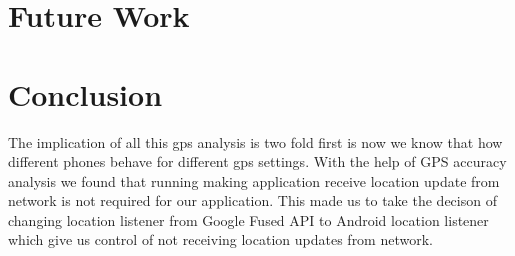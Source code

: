 \documentclass[12pt]{report}
\begin{document}
\chapter{Future Work}







\chapter{Conclusion}
The implication of all this gps analysis is two fold first is now we know that
how different phones behave for different gps settings. With the help of GPS
accuracy analysis we found that running making application receive location
update from network is not required for our application. This made us to take
the decison of changing location listener from Google Fused API to Android
location listener which give us control of not receiving location updates from
network.
\end{document}
